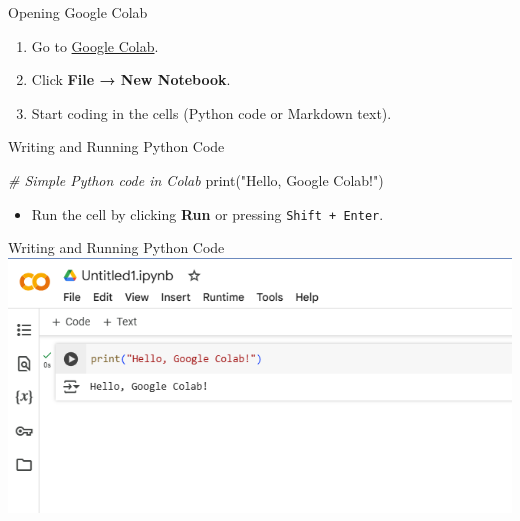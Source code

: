 \documentclass[
  ignorenonframetext,
]{beamer}
\newenvironment{Shaded}{\begin{snugshade}}{\end{snugshade}}
\newcommand{\BuiltInTok}[1]{#1}
\newcommand{\CommentTok}[1]{\textcolor[rgb]{0.56,0.35,0.01}{\textit{#1}}}
\newcommand{\NormalTok}[1]{#1}
\newcommand{\StringTok}[1]{\textcolor[rgb]{0.31,0.60,0.02}{#1}}
\providecommand{\tightlist}{%
  \setlength{\itemsep}{0pt}\setlength{\parskip}{0pt}}
\begin{document}
\begin{frame}{Opening Google Colab}
\label{opening-google-colab}
\begin{enumerate}
\tightlist
\item
  Go to \href{https://colab.research.google.com/}{Google Colab}.
\item
  Click \textbf{File → New Notebook}.
\item
  Start coding in the cells (Python code or Markdown text).
\end{enumerate}
\end{frame}

\begin{frame}[fragile]{Writing and Running Python Code}
\label{writing-and-running-python-code}

\begin{Shaded}
\begin{Highlighting}[]
\CommentTok{\# Simple Python code in Colab}
\BuiltInTok{print}\NormalTok{(}\StringTok{"Hello, Google Colab!"}\NormalTok{)}
\end{Highlighting}
\end{Shaded}

\begin{itemize}
\tightlist
\item
  Run the cell by clicking \textbf{Run} or pressing
  \texttt{Shift\ +\ Enter}.
\end{itemize}
\end{frame}

\begin{frame}{Writing and Running Python Code}
\label{writing-and-running-python-code-1}
\includegraphics{../images/im222.png}
\end{frame}
\end{document}
